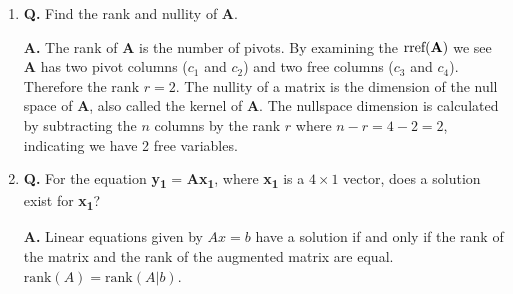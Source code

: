 \documentclass[main.tex]{subfiles}
\begin{document}
\begin{enumerate}
\begin{enumerate}
        \item \textbf{Q.} Find the rank and nullity of \textbf{A}. 
        
        \textbf{A.} The rank of \textbf{A} is the number of pivots. By examining the $\text{rref(\textbf{A})}$ we see \textbf{A} has two pivot columns ($c_1$ and $c_2$) and two free columns ($c_3$ and $c_4$). Therefore the rank $r=2$. The nullity of a matrix is the dimension of the null space of \textbf{A}, also called the kernel of \textbf{A}. The nullspace dimension is calculated by subtracting the $n$ columns by the rank $r$ where $n-r = 4-2 = 2$, indicating we have 2 free variables.
        
        \item \textbf{Q.} For the equation \textbf{y\textsubscript{1}} = \textbf{A}\textbf{x\textsubscript{1}}, where \textbf{x\textsubscript{1}} is a $4\times1$ vector, does a solution exist for \textbf{x\textsubscript{1}}? 
        
        \textbf{A.} Linear equations given by $Ax = b$ have a solution if and only if the rank of the matrix and the rank of the augmented matrix are equal. $\text{rank}(A)=\text{rank}(A|b)$. 


\end{enumerate}
\end{enumerate}
\end{document}
